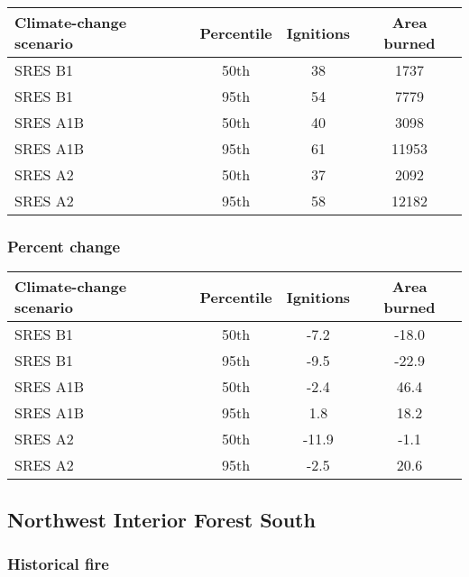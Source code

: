 \documentclass{article}\usepackage[]{graphicx}\usepackage[]{color}
\newcommand{\headcol}{\rowcolor{tableheadcolor}}
\begin{document}
\begin{table}[ht]
\centering
\begin{tabular}{lccc}
  \headcol 
 \toprule
Climate-change scenario & Percentile & Ignitions & Area burned \\ 
  \midrule
SRES B1 & 50th & 38 & 1737 \\ 
  SRES B1 & 95th & 54 & 7779 \\ 
  SRES A1B & 50th & 40 & 3098 \\ 
  SRES A1B & 95th & 61 & 11953 \\ 
  SRES A2 & 50th & 37 & 2092 \\ 
  SRES A2 & 95th & 58 & 12182 \\ 
   \bottomrule
\end{tabular}
\end{table}


\subsubsection{Percent change}

\begin{table}[ht]
\centering
\begin{tabular}{lccc}
  \headcol 
 \toprule
Climate-change scenario & Percentile & Ignitions & Area burned \\ 
  \midrule
SRES B1 & 50th & -7.2 & -18.0 \\ 
  SRES B1 & 95th & -9.5 & -22.9 \\ 
  SRES A1B & 50th & -2.4 & 46.4 \\ 
  SRES A1B & 95th & 1.8 & 18.2 \\ 
  SRES A2 & 50th & -11.9 & -1.1 \\ 
  SRES A2 & 95th & -2.5 & 20.6 \\ 
   \bottomrule
\end{tabular}
\end{table}


\newpage
\pagebreak
\subsection{Northwest Interior Forest South}
\subsubsection{Historical fire}
\end{document}
